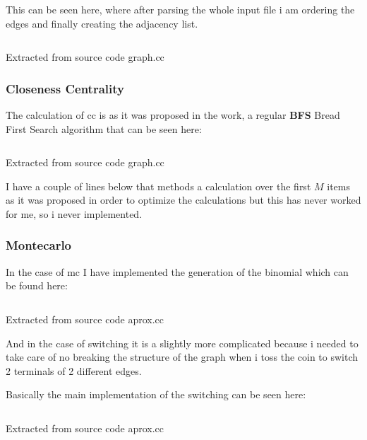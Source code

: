 \documentclass[12pt, a4paper]{article}
\begin{document}
This can be seen here, where after parsing the whole input file i am ordering the edges and finally creating the adjacency list.

\begin{listing}[H]
    \inputminted[firstline=151, lastline=167, breaklines]{cpp}{../src/domain/graph.cc}
    \caption{Extracted from source code graph.cc}
    \label{source:code:2}
\end{listing}  

\subsubsection{Closeness Centrality}
The calculation of \acrshort{cc} is as it was proposed in the work, a regular \textbf{BFS} Bread First Search algorithm 
that can be seen here:

\begin{listing}[H]
    \inputminted[firstline=233, lastline=270, breaklines]{cpp}{../src/domain/graph.cc}
    \caption{Extracted from source code graph.cc}
    \label{source:code:3}
\end{listing} 

I have a couple of lines below that methods a calculation over the first $M$ items as it was 
proposed in order to optimize the calculations but this has never worked for me, so i never implemented.

\subsubsection{Montecarlo}
In the case of \acrshort{mc} I have implemented the generation of the \acrshort{binomial} which can be found here:

\begin{listing}[H]
    \inputminted[firstline=77, lastline=107, breaklines]{cpp}{../src/graph/aprox.cc}
    \caption{Extracted from source code aprox.cc}
    \label{source:code:4}
\end{listing} 

And in the case of \acrshort{switching} it is a slightly more complicated because i needed to take care of no breaking the 
structure of the graph when i toss the coin to switch 2 terminals of 2 different edges.

Basically the main implementation of the \acrshort{switching} can be seen here:

\begin{listing}[H]
    \inputminted[firstline=64, lastline=74, breaklines]{cpp}{../src/graph/aprox.cc}
    \caption{Extracted from source code aprox.cc}
    \label{source:code:5}
\end{listing} 
\end{document}
